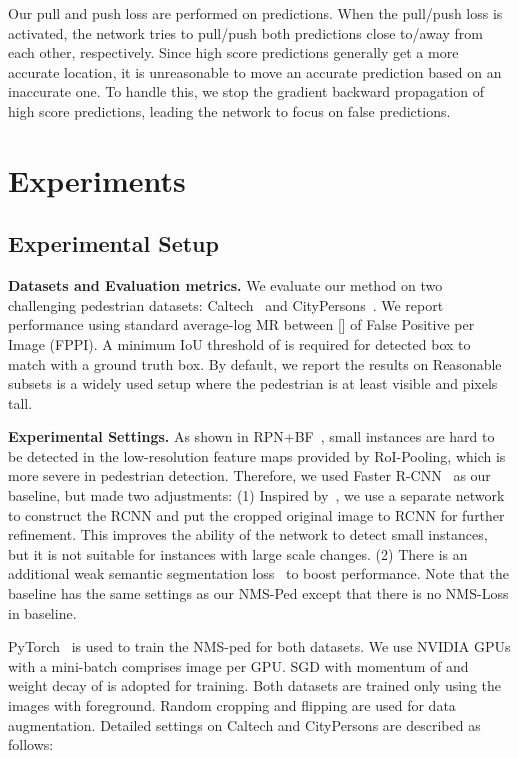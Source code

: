 \documentclass[sigconf]{acmart}
\begin{document}
Our pull and push loss are performed on predictions. When the pull/push loss is activated, the network tries to pull/push both predictions close to/away from each other, respectively.
Since high score predictions generally get a more accurate location, it is unreasonable to move an accurate prediction based on an inaccurate one. To handle this, we stop the gradient backward propagation of high score predictions, leading the network to focus on false predictions.

\section{Experiments}
\subsection{Experimental Setup}

\noindent
\textbf{Datasets and Evaluation metrics.} We evaluate our method on two challenging pedestrian datasets: Caltech~\cite{dollar2009pedestrian,dollar2011pedestrian} and CityPersons~\cite{zhang2017citypersons}. We report performance using standard average-log MR between [] of False Positive per Image (FPPI). A minimum IoU threshold of  is required for detected box to match with a ground truth box. By default, we report the results on Reasonable subsets is a widely used setup where the pedestrian is at least  visible and  pixels tall.

\noindent
\textbf{Experimental Settings.}
As shown in RPN+BF~\cite{zhang2016faster}, small instances are hard to be detected in the low-resolution feature maps provided by RoI-Pooling, which is more severe in pedestrian detection. Therefore, we used Faster R-CNN~\cite{ren2015faster} as our baseline, but made two adjustments: (1) Inspired by~\cite{zhang2016faster}, we use a separate network to construct the RCNN and put the cropped original image to RCNN for further refinement. This improves the ability of the network to detect small instances, but it is not suitable for instances with large scale changes. (2) There is an additional weak semantic segmentation loss~\cite{brazil2017illuminating} to boost performance. Note that the baseline has the same settings as our NMS-Ped except that there is no NMS-Loss in baseline.

PyTorch~\cite{paszke2017automatic} is used to train the NMS-ped for both datasets. We use  NVIDIA GPUs with a mini-batch comprises  image per GPU. SGD with momentum of  and weight decay of  is adopted for training. Both datasets are trained only using the images with foreground. Random cropping and flipping are used for data augmentation. Detailed settings on Caltech and CityPersons are described as follows:
\end{document}
